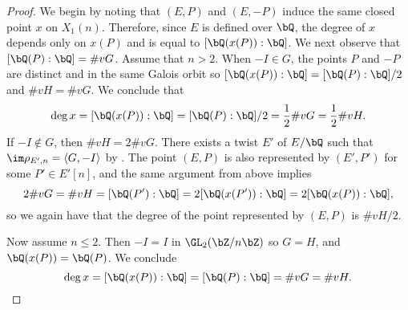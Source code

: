 \documentclass[11pt,reqno]{amsart}
\theoremstyle{plain}
\newtheorem{proposition}[theorem]{Proposition}
\theoremstyle{definition}
\newcommand{\Q}{\bQ}
\newcommand{\Z}{\bZ}
\begin{document}
\begin{proof}
    We begin by noting that $(E, P)$ and $(E, -P)$ induce the same closed point $x$ on $X_1(n)$. Therefore, since $E$ is defined over $\Q$, the degree of
    $x$ depends only on $x(P)$ and is equal to $[\Q(x(P)):\Q]$. 
    We next observe that $[\Q(P):\Q]=\#vG$. Assume that $n>2$. When $-I\in G$, the points $P$ and $-P$ are distinct and in the same Galois orbit so $[\Q(x(P)):\Q]=[\Q(P):\Q]/2$ and $\#vH=\#vG$. We conclude that 
    \[
    \deg x = [\Q(x(P)):\Q] = [\Q(P):\Q]/2 = \frac{1}{2}\#vG = \frac{1}{2}\#vH. 
    \]
    If $-I \notin G$, then $\#vH=2\#vG$. There exists a twist $E'$ of $E/\Q$ such that $\im \rho_{E',n}=\langle G, -I \rangle$ by \cite[Corollary 5.25]{sutherland}. The point $(E,P)$ is also represented by $(E',P')$ for some $P'\in E'[n]$, and the same argument from above  implies 
    \[
    2\#vG=\#vH = [\Q(P'):\Q] = 2[\Q(x(P')):\Q] = 2[\Q(x(P)):\Q],
    \]
    so we again have that the degree of the point represented by $(E,P)$ is $\#vH/2$. 

    Now assume $n\leq 2$. Then $-I=I$ in $\GL_2(\Z/n\Z)$ so $G=H$, and $\Q(x(P))=\Q(P)$. We conclude 
    \[
    \deg x = [\Q(x(P)):\Q] = [\Q(P):\Q] = \#vG = \#vH. \qedhere
    \]
\end{proof}

    
\end{document}
